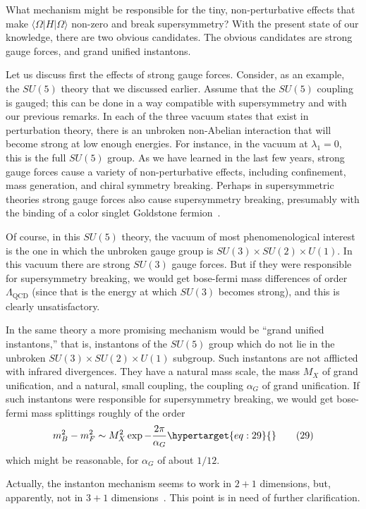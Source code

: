 \documentclass[11pt,a4paper]{article}
\newcommand{\eqtarget}[1]{\hypertarget{eq:#1}{\mathstrut}\tag{#1}}
\begin{document}
What mechanism might be responsible for the tiny, non-perturbative
effects that make $\langle \Omega| H |\Omega \rangle$ non-zero and break supersymmetry?
With the present state of our knowledge, there are two obvious candidates.
The obvious candidates are strong gauge forces, and grand
unified instantons.

Let us discuss first the effects of strong gauge forces. Consider,
as an example, the $SU(5)$ theory that we discussed earlier.
Assume that the $SU(5)$ coupling is gauged; this can be done in a way
compatible with supersymmetry and with our previous remarks. In each
of the three vacuum states that exist in perturbation theory, there
is an unbroken non-Abelian interaction that will become strong at low
enough energies. For instance, in the vacuum at $\lambda_1 = 0$, this is the
full $SU(5)$ group. As we have learned in the last few years, strong
gauge forces cause a variety of non-perturbative effects, including
confinement, mass generation, and chiral symmetry breaking. Perhaps
in supersymmetric theories strong gauge forces also cause supersymmetry
breaking, presumably with the binding of a color singlet
Goldstone fermion~\cite{ref6,ref11}.

Of course, in this $SU(5)$ theory, the vacuum of most phenomenological
interest is the one in which the unbroken gauge group is
$SU(3) \times SU(2) \times U(1)$. In this vacuum there are strong $SU(3)$ gauge
forces. But if they were responsible for supersymmetry breaking, we
would get bose-fermi mass differences of order $\Lambda_{\mathrm{QCD}}$ (since that is
the energy at which $SU(3)$ becomes strong), and this is clearly unsatisfactory.

In the same theory a more promising mechanism would be ``grand
unified instantons,'' that is, instantons of the $SU(5)$ group which
do not lie in the unbroken $SU(3) \times SU(2) \times U(1)$ subgroup. Such
instantons are not afflicted with infrared divergences. They have
a natural mass scale, the mass $M_X$ of grand unification, and a natural,
small coupling, the coupling $\alpha_G$ of grand unification. If such instantons
were responsible for supersymmetry breaking, we would get
bose-fermi mass splittings roughly of the order
\begin{equation}
m_B^2 - m_F^2 \sim M_X^2 \exp - \frac{2\pi}{\alpha_G}
\eqtarget{29}
\end{equation}
which might be reasonable, for $\alpha_G$ of about $1/12$.

Actually, the instanton mechanism seems to work in $2+1$ dimensions,
but, apparently, not in $3+1$ dimensions~\cite{ref6}. This point is in
need of further clarification.
\end{document}
